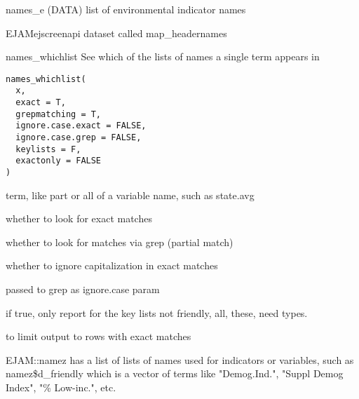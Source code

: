 \documentclass[a4paper]{book}
\begin{document}
%
\begin{Description}\relax
names\_e (DATA) list of environmental indicator names
\end{Description}
%
\begin{SeeAlso}\relax
EJAMejscreenapi dataset called map\_headernames   
\end{SeeAlso}
%
\begin{Description}\relax
names\_whichlist
See which of the lists of names a single term appears in
\end{Description}
%
\begin{Usage}
\begin{verbatim}
names_whichlist(
  x,
  exact = T,
  grepmatching = T,
  ignore.case.exact = FALSE,
  ignore.case.grep = FALSE,
  keylists = F,
  exactonly = FALSE
)
\end{verbatim}
\end{Usage}
%
\begin{Arguments}
\begin{ldescription}
\item[\code{x}] term, like part or all of a variable name, such as state.avg

\item[\code{exact}] whether to look for exact matches

\item[\code{grepmatching}] whether to look for matches via grep (partial match)

\item[\code{ignore.case.exact}] whether to ignore capitalization in exact matches

\item[\code{ignore.case.grep}] passed to grep as ignore.case param

\item[\code{keylists}] if true, only report for the key lists not friendly, all, these, need types.

\item[\code{exactonly}] to limit output to rows with exact matches
\end{ldescription}
\end{Arguments}
%
\begin{Details}\relax
EJAM::namez has a list of lists of names used for indicators or variables, such as
namez\$d\_friendly which is a vector of terms like
"Demog.Ind.", "Suppl Demog Index",  "\% Low-inc.", etc.
\end{Details}
\end{document}
